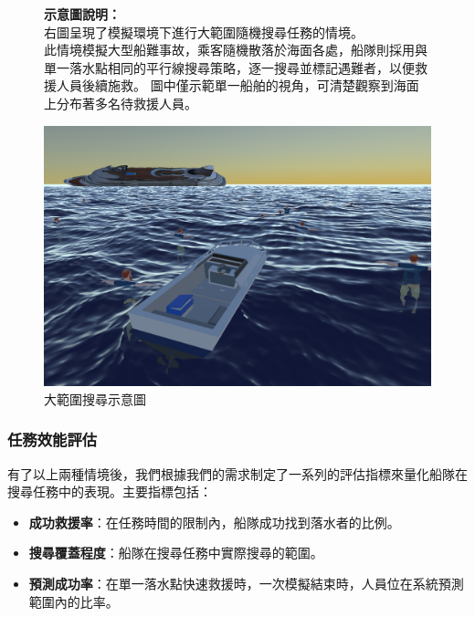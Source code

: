 \documentclass[12pt,a4paper]{article}
\begin{document}
\begin{figure}[h]
    \begin{minipage}[t]{0.55\textwidth}
        \vspace{1cm} 
        \textbf{示意圖說明：}\\
	右圖呈現了模擬環境下進行大範圍隨機搜尋任務的情境。\\
	此情境模擬大型船難事故，乘客隨機散落於海面各處，船隊則採用與單一落水點相同的平行線搜尋策略，逐一搜尋並標記遇難者，以便救援人員後續施救。
	圖中僅示範單一船舶的視角，可清楚觀察到海面上分布著多名待救援人員。
    \end{minipage}
    \hspace{2em}
    \begin{minipage}[t]{0.45\textwidth}
        \vspace{0pt}
        \centering
        \includegraphics[width=\textwidth]{image/MultiDemo.png}
        \caption{大範圍搜尋示意圖}
    \end{minipage}
\end{figure}

\newpage

\subsubsection{任務效能評估}
有了以上兩種情境後，我們根據我們的需求制定了一系列的評估指標來量化船隊在搜尋任務中的表現。主要指標包括：
\begin{itemize}
    \item \textbf{成功救援率}：在任務時間的限制內，船隊成功找到落水者的比例。
    \item \textbf{搜尋覆蓋程度}：船隊在搜尋任務中實際搜尋的範圍。
    \item \textbf{預測成功率}：在單一落水點快速救援時，一次模擬結束時，人員位在系統預測範圍內的比率。
\end{itemize}
\end{document}
